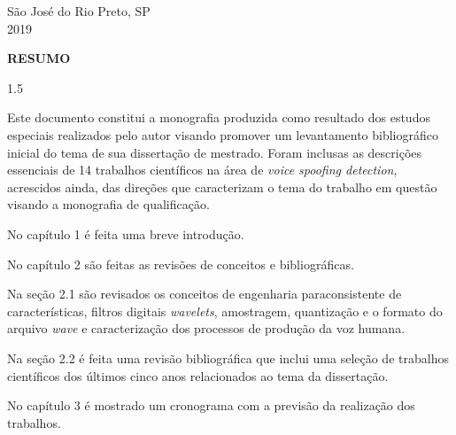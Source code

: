 \documentclass[a4paper,12pt,openright,oneside]{book}
\newenvironment{myenv}[1]
  {\begin{spacing}{#1}}
  {\end{spacing}}
\begin{document}
	\begin{center}
		São José do Rio Preto, SP  \\ \vspace{1.0pt}
		2019
	\end{center}


	\setlength{\parindent}{0pt}
	\newpage \thispagestyle{empty}
	\vspace{1.5cm}
	\fontsize{12}{\baselineskip} \selectfont

	\begin{center}
		{\huge{\textbf{RESUMO}}}
	\end{center}

	\begin{myenv}{1.5}
		\fontsize{12}{\baselineskip} \selectfont \onehalfspacing
		\par \null
		\par \null
		\par Este documento constitui a monografia produzida como resultado dos estudos especiais realizados pelo autor visando promover um levantamento bibliográfico inicial do tema de sua dissertação de mestrado. Foram inclusas as descrições essenciais de 14 trabalhos científicos na área de \textit{voice spoofing detection}, acrescidos ainda, das direções que caracterizam o tema do trabalho em questão visando a monografia de qualificação.
		
		\par No capítulo 1 é feita uma breve introdução.
		
		\par No capítulo 2 são feitas as revisões de conceitos e bibliográficas.
		
		\par Na seção 2.1 são revisados os conceitos de engenharia paraconsistente de características, filtros digitais \textit{wavelets}, amostragem,  quantização e o formato do arquivo \textit{wave} e caracterização dos processos de produção da voz humana.
		
		\par Na seção 2.2 é feita uma revisão bibliográfica que inclui uma seleção de trabalhos científicos dos últimos cinco anos relacionados ao tema da dissertação. 
		
		\par No capítulo 3 é mostrado um cronograma com a previsão da realização dos trabalhos.
		
	\end{myenv}
\end{document}
